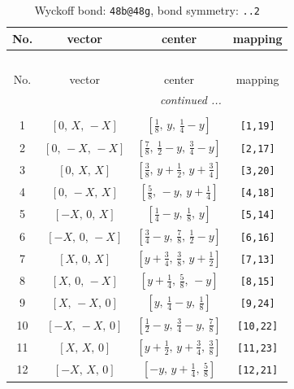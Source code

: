 \documentclass[fleqn,8pt]{jsarticle}
\begin{document}
\renewcommand{\arraystretch}{1.2}
\begin{longtable}{cccc}
\caption{Wyckoff bond: {\tt 48b@48g}, bond symmetry: {\tt ..2}}
 \\
 \hline \hline
No. & vector & center & mapping \\ \hline \endfirsthead

\multicolumn{3}{l}{\tablename\ \thetable{}} \\
 \hline \hline
No. & vector & center & mapping \\ \hline \endhead

 \hline \hline
\multicolumn{3}{r}{\footnotesize\it continued ...} \\ \endfoot

 \hline \hline
\multicolumn{3}{r}{} \\ \endlastfoot

1 & $\left[ 0,\, X,\, - X \right]$ & $\left[ \frac{1}{8},\, y,\, \frac{1}{4} - y \right]$ & {\tt [1,19]} \\ \hline
2 & $\left[ 0,\, - X,\, - X \right]$ & $\left[ \frac{7}{8},\, \frac{1}{2} - y,\, \frac{3}{4} - y \right]$ & {\tt [2,17]} \\ \hline
3 & $\left[ 0,\, X,\, X \right]$ & $\left[ \frac{3}{8},\, y + \frac{1}{2},\, y + \frac{3}{4} \right]$ & {\tt [3,20]} \\ \hline
4 & $\left[ 0,\, - X,\, X \right]$ & $\left[ \frac{5}{8},\, - y,\, y + \frac{1}{4} \right]$ & {\tt [4,18]} \\ \hline
5 & $\left[ - X,\, 0,\, X \right]$ & $\left[ \frac{1}{4} - y,\, \frac{1}{8},\, y \right]$ & {\tt [5,14]} \\ \hline
6 & $\left[ - X,\, 0,\, - X \right]$ & $\left[ \frac{3}{4} - y,\, \frac{7}{8},\, \frac{1}{2} - y \right]$ & {\tt [6,16]} \\ \hline
7 & $\left[ X,\, 0,\, X \right]$ & $\left[ y + \frac{3}{4},\, \frac{3}{8},\, y + \frac{1}{2} \right]$ & {\tt [7,13]} \\ \hline
8 & $\left[ X,\, 0,\, - X \right]$ & $\left[ y + \frac{1}{4},\, \frac{5}{8},\, - y \right]$ & {\tt [8,15]} \\ \hline
9 & $\left[ X,\, - X,\, 0 \right]$ & $\left[ y,\, \frac{1}{4} - y,\, \frac{1}{8} \right]$ & {\tt [9,24]} \\ \hline
10 & $\left[ - X,\, - X,\, 0 \right]$ & $\left[ \frac{1}{2} - y,\, \frac{3}{4} - y,\, \frac{7}{8} \right]$ & {\tt [10,22]} \\ \hline
11 & $\left[ X,\, X,\, 0 \right]$ & $\left[ y + \frac{1}{2},\, y + \frac{3}{4},\, \frac{3}{8} \right]$ & {\tt [11,23]} \\ \hline
12 & $\left[ - X,\, X,\, 0 \right]$ & $\left[ - y,\, y + \frac{1}{4},\, \frac{5}{8} \right]$ & {\tt [12,21]} \\
\end{longtable}
\end{document}
